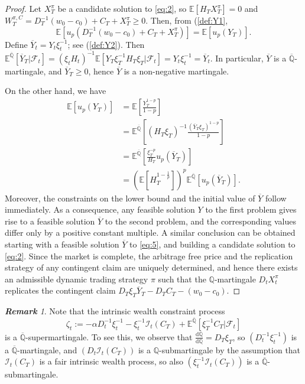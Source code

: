 \documentclass[a4paper]{amsart}
\theoremstyle{definition}
\theoremstyle{remark}
\newtheorem{remark}[theorem]{\textbf{Remark}}
\numberwithin{equation}{section}
\newcommand{\E}{\mathbb{E}}
\newcommand{\Q}{\mathbb{Q}}
\newcommand{\di}{\mathrm{d}}
\newcommand{\Fc}{\mathcal{F}}
\newcommand{\Ep}[1]{\E\left[#1\right]}
\newcommand{\Ebq}[1]{\E^{\bQ}\left[#1\right]}
\newcommand{\comment}[1]{{\color{red} \bf #1}}
\newcommand{\ol}{\overline}
\newcommand{\In}{\mathcal{I}} %
\newcommand{\bQ}{\ol{\mathbb{Q}}}
\begin{document}
\begin{proof}
  Let $X_T^\pi$ be a candidate solution to \eqref{eq:2}, so $\Ep{H_T X_T^\pi} = 0$ and $W_T^{\pi,C} = D_T^{-1}(w_0 - c_0) + C_T + X_T^\pi \ge 0$. Then, from (\ref{def:Y1}, 
  \begin{equation*}
    \Ep{u_p(D_T^{-1}(w_0 - c_0) + C_T + X_T^\pi)} = \Ep{u_p(Y_T)}.
  \end{equation*}
  Define $\ol{Y}_t = Y_t \xi_t^{-1}$; see (\ref{def:Y2}). Then $\Ebq{\ol{Y}_T | \Fc_t} = (\xi_t H_t)^{-1}\Ep{Y_T \xi^{-1}_T H_T \xi_T| \Fc_t} =Y_t  \xi_t^{-1} = \ol{Y}_t$. In particular, $\ol{Y}$ is a $\bQ$-martingale, and $\ol{Y}_T \ge 0$, hence $\ol{Y}$ is a non-negative martingale.
  
  On the other hand, we have 
  \begin{align*}
    \Ep{u_p(Y_T)} 
    & = \Ep{\frac{Y_T^{1-p}}{1-p}}\\
    & = \Ebq{(H_T \xi_T)^{-1} \frac{(\ol{Y}_T\xi_T)^{1-p}}{1-p}}\\
    & = \Ebq{\frac{\xi_T^{-p}}{H_T} u_p(\ol{Y}_T)}\\
    & = \left(\Ep{H_T^{1-\frac{1}{p}}}\right)^{p} \Ebq{u_p(\ol{Y}_T)}.
  \end{align*}
  Moreover, the constraints on the lower bound and the initial value of $\ol{Y}$ follow immediately. As a consequence, any feasible solution $Y$ to the first problem gives rise to a feasible solution $\ol{Y}$ to the second problem, and the corresponding values differ only by a positive constant multiple.  A similar conclusion can be obtained starting with a feasible solution $\ol{Y}$  to  \eqref{eq:5}, and building a candidate solution to   \eqref{eq:2}. Since the market is complete,  the arbitrage free price and the replication strategy of any contingent claim are uniquely determined, and hence there exists an admissible dynamic trading strategy $\pi$  such that  the $\Q$-martingale  $D_t X_t^{\pi}$ replicates the contingent claim $D_T \xi_T \ol{Y}_T-D_T C_T-(w_0-c_0)$.   
\end{proof}

\begin{remark}\label{rem:restprop}
  Note that the intrinsic wealth constraint process
  \begin{equation} \label{eq:ZetaDef}
    \zeta_t := -\alpha D_t^{-1}\xi_t^{-1} - \xi_t^{-1} \In_t(C_T) + \Ebq{ \xi_T^{-1} C_T | \Fc_t}
  \end{equation}
  is a $\bQ$-supermartingale.  To see this, we observe that $\frac{\di \bQ}{\di \Q} = D_T \xi_T$, so $(D_t^{-1}\xi_t^{-1})$ is a $\bQ$-martingale, and $(D_t \In_t(C_T))$ is a $\Q$-submartingale by the assumption that $\In_t(C_T)$ is a fair intrinsic wealth process, so also $(\xi_t^{-1} \In_t(C_T))$ is a $\bQ$-submartingale.
  
\end{remark}
\end{document}
